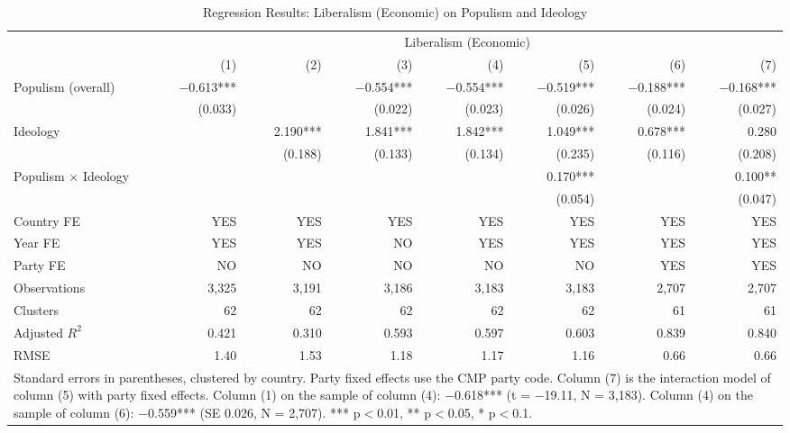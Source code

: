 \begin{table}
\caption{Regression Results: Liberalism (Economic) on Populism and Ideology}
\label{tab:7}
\scriptsize\setlength{\tabcolsep}{4pt}
\centering
\begin{tabular}{lrrrrrrr}
\toprule
 & \multicolumn{7}{c}{Liberalism (Economic)} \\
 & (1) & (2) & (3) & (4) & (5) & (6) & (7) \\
 \midrule
Populism (overall) & $-$0.613*** &  & $-$0.554*** & $-$0.554*** & $-$0.519*** & $-$0.188*** & $-$0.168*** \\
& (0.033) &  & (0.022) & (0.023) & (0.026) & (0.024) & (0.027) \\
Ideology &  & 2.190*** & 1.841*** & 1.842*** & 1.049*** & 0.678*** & 0.280 \\
&  & (0.188) & (0.133) & (0.134) & (0.235) & (0.116) & (0.208) \\
Populism $\times$ Ideology &  &  &  &  & 0.170*** &  & 0.100** \\
&  &  &  &  & (0.054) &  & (0.047) \\
\midrule
Country FE & YES & YES & YES & YES & YES & YES & YES\\
Year FE & YES & YES & NO & YES & YES & YES & YES\\
Party FE & NO & NO & NO & NO & NO & YES & YES\\
Observations & 3,325 & 3,191 & 3,186 & 3,183 & 3,183 & 2,707 & 2,707 \\
Clusters & 62 & 62 & 62 & 62 & 62 & 61 & 61 \\
Adjusted $R^2$ & 0.421 & 0.310 & 0.593 & 0.597 & 0.603 & 0.839 & 0.840 \\
RMSE & 1.40 & 1.53 & 1.18 & 1.17 & 1.16 & 0.66 & 0.66 \\
\bottomrule
\multicolumn{8}{p{0.9\linewidth}}{\scriptsize Standard errors in parentheses, clustered by country. Party fixed effects use the CMP party code. Column (7) is the interaction model of column (5) with party fixed effects. Column (1) on the sample of column (4): $-$0.618*** (t = $-$19.11, N = 3,183). Column (4) on the sample of column (6): $-$0.559*** (SE 0.026, N = 2,707). *** p$<$0.01, ** p$<$0.05, * p$<$0.1.} \\
\end{tabular}
\end{table}
